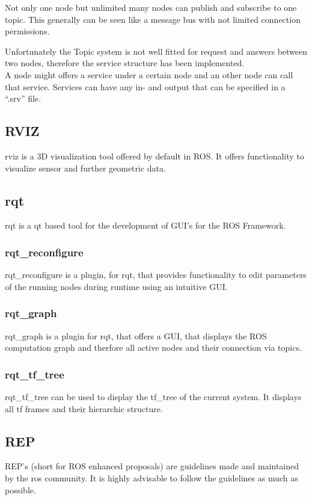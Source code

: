 Not only one node but unlimited many nodes can publish and subscribe to one topic. This generally can be seen like a message bus with not limited connection permissions\cite{rosconcepts}.

Unfortunately the Topic system is not well fitted for request and answers between two nodes, therefore the service structure has been implemented.\\ 
A node might offers a service under a certain node and an other node can call that service. Services can have any in- and output that can be specified in a ``.srv'' file\cite{rosconcepts}.

\subsection{RVIZ}
rviz is a 3D visualization tool offered by default in ROS. It offers functionality to visualize sensor and further geometric data.\\
\subsection{rqt}
rqt is a qt based tool for the development of GUI's for the ROS Framework\cite{rqt}.
\subsubsection{rqt\_reconfigure}
	rqt\_reconfigure is a plugin, for rqt, that provides functionality to edit parameters of the running nodes during runtime using an intuitive GUI\cite{rqtrecon}.
	
\subsubsection{rqt\_graph}

	rqt\_graph is a plugin for rqt, that offers a GUI, that displays the ROS computation graph and therfore all active nodes and their connection via topics\cite{rqtgraph}.
\subsubsection{rqt\_tf\_tree}
	rqt\_tf\_tree can be used to display the tf\_tree of the current system. It displays all tf frames and their hierarchic structure\cite{rqttftree}.
\subsection{REP}
REP's (short for ROS enhanced proposals) are guidelines made and maintained by the ros community. It is highly advisable to follow the guidelines as much as possible.

